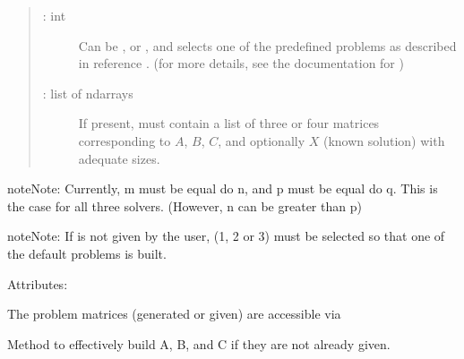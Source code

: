 \documentclass[a4paper,10pt,english]{sphinxmanual}
\begin{document}
\begin{fulllineitems}
\begin{quote}
\begin{description}
\item[{ : int}] \leavevmode
Can be ,  or , and selects one of the predefined
problems as described in reference {\hyperref[\detokenize{index:bibliography}]{}}.
(for more details, see the documentation for )

\item[{ : list of ndarrays}] \leavevmode
If present, must contain a list of three or four matrices 
corresponding to \(A\), \(B\), \(C\), and optionally
\(X\) (known solution) with adequate sizes.

\end{description}
\end{quote}

\begin{sphinxadmonition}{note}{Note:}
Currently, m must be equal do n, and p must be equal do q. This 
is the case for all three solvers. (However, n can be greater than
p)
\end{sphinxadmonition}

\begin{sphinxadmonition}{note}{Note:}
If  is not given by the user, 
(1, 2 or 3) must be selected so that one of the default problems 
is built.
\end{sphinxadmonition}

Attributes:

The problem matrices (generated or given) are accessible via

\begin{sphinxVerbatim}[commandchars=\\\{\}]
\end{sphinxVerbatim}

\begin{fulllineitems}
\label{\detokenize{skprocrustes:skprocrustes.ProcrustesProblem._setproblem}}
Method to effectively build A, B, and C if they are not already given.


\end{fulllineitems}
\end{fulllineitems}
\end{document}
